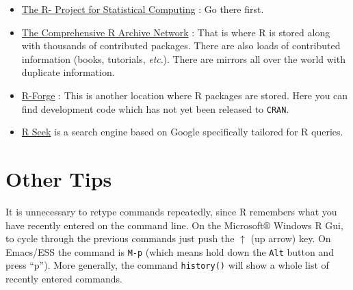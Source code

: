 \documentclass[]{book}
\providecommand{\tightlist}{%
  \setlength{\itemsep}{0pt}\setlength{\parskip}{0pt}}
\numberwithin{equation}{chapter}
\numberwithin{figure}{chapter}
\theoremstyle{plain}
\theoremstyle{definition}
\theoremstyle{remark}
\theoremstyle{definition}
\theoremstyle{definition}
\theoremstyle{remark}
\begin{document}
\begin{itemize}
\tightlist
\item
  \href{http://www.r-project.org/}{The R- Project for Statistical
  Computing} : Go there first.
\item
  \href{http://cran.r-project.org/}{The Comprehensive R Archive Network}
  : That is where R is stored along with thousands of
  contributed packages. There are also loads of contributed information
  (books, tutorials, \emph{etc}.). There are mirrors all over the world
  with duplicate information.
\item
  \href{http://r-forge.r-project.org/}{R-Forge}
  : This is another location where R
  packages are stored. Here you can find development code which has not
  yet been released to \texttt{CRAN}.
\item
  \href{http://www.rseek.org}{R Seek} is a search engine based on Google
  specifically tailored for R queries.
\end{itemize}

\section{Other Tips}\label{other-tips}

It is unnecessary to retype commands repeatedly, since R remembers what
you have recently entered on the command line. On the
Microsoft\(\circledR\) Windows R Gui, to cycle through the previous
commands just push the \(\uparrow\) (up arrow) key. On Emacs/ESS the
command is \texttt{M-p} (which means hold down the \texttt{Alt} button
and press ``p''). More generally, the command \texttt{history()}
 will show a whole list of recently
entered commands.
\end{document}
